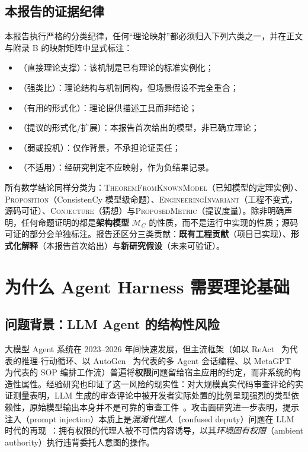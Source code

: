 \section{本报告的证据纪律}

本报告执行严格的分类纪律，任何“理论映射”都必须归入下列六类之一，并在正文与附录 B 的映射矩阵中显式标注：
\begin{itemize}[itemsep=0.05em]
  \item \DIRECT{}（直接理论支撑）：该机制是已有理论的标准实例化；
  \item \STRONG{}（强类比）：理论结构与机制同构，但场景假设不完全重合；
  \item \USEFUL{}（有用的形式化）：理论提供描述工具而非结论；
  \item \PROPOSED{}（提议的形式化/扩展）：本报告首次给出的模型，非已确立理论；
  \item \WEAK{}（弱或投机）：仅作背景，不承担论证责任；
  \item \NA{}（不适用）：经研究判定不应映射，作为负结果记录。
\end{itemize}
所有数学结论同样分类为：\textsc{TheoremFromKnownModel}（已知模型的定理实例）、\textsc{Proposition}（ConsistenCy 模型级命题）、\textsc{EngineeringInvariant}（工程不变式，源码可证）、\textsc{Conjecture}（猜想）与\textsc{ProposedMetric}（提议度量）。除非明确声明，任何命题证明的都是\textbf{架构模型} $\mathcal{M}_C$ 的性质，而不是运行中实现的性质；源码可证的部分会单独标注。报告还区分三类贡献：\textbf{既有工程贡献}（项目已实现）、\textbf{形式化解释}（本报告首次给出）与\textbf{新研究假设}（未来可验证）。

\chapter{为什么 Agent Harness 需要理论基础}\label{ch:why}

\section{问题背景：LLM Agent 的结构性风险}

大模型 Agent 系统在 2023--2026 年间快速发展，但主流框架（如以 ReAct~\cite{yao2023react} 为代表的推理-行动循环、以 AutoGen~\cite{wu2024autogen} 为代表的多 Agent 会话编程、以 MetaGPT~\cite{hong2024metagpt} 为代表的 SOP 编排工作流）普遍将\textbf{权限}问题留给宿主应用的约定，而非系统的构造性属性。经验研究也印证了这一风险的现实性：对大规模真实代码审查评论的实证测量表明，LLM 生成的审查评论中被开发者实际处置的比例呈现强烈的类型依赖性，原始模型输出本身并不是可靠的审查工件~\cite{goldman2025}。攻击面研究进一步表明，提示注入（prompt injection）本质上是\emph{混淆代理人}（confused deputy）问题在 LLM 时代的再现~\cite{hardy1988,debenedetti2025}：拥有权限的代理人被不可信内容诱导，以其\emph{环境固有权限}（ambient authority）执行违背委托人意图的操作。

